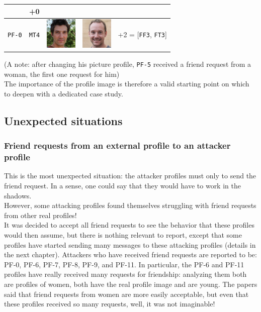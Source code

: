 \begin{center}
\begin{tabular}[c]{ |c|c|m{1.5cm}|m{1.5cm}|c| }
	& +0 \\	 
	\hline
	\cellcolor[HTML]{b0d7ff}\texttt{PF-0}
	&\cellcolor[HTML]{e6f2ff}\texttt{MT4}
	&\vspace{.15cm}	\includegraphics[height=1.5cm]{immagini/MT4.jpg}
	&\vspace{.15cm}	\includegraphics[height=1.5cm]{immagini/MT4-new.jpg}
	&+2 = [\texttt{FF3}, \texttt{FT3}]\\
	\hline 	 	 	 	 	
\end{tabular}
	
\end{center}
(A note: after changing his picture profile, \texttt{PF-5} received a friend request from a woman, the first one request for him)\\
The importance of the profile image is therefore a valid starting point on which to deepen with a dedicated case study.
\subsection{Unexpected situations}
\subsubsection*{Friend requests from an external profile to an attacker profile}
This is the most unexpected situation: the attacker profiles must only to send the friend request. In a sense, one could say that they would have to work in the shadows.\\However, some attacking profiles found themselves struggling with friend requests from other real profiles!\\It was decided to accept all friend requests to see the behavior that these profiles would then assume, but there is nothing relevant to report, except that some profiles have started sending many messages to these attacking profiles (details in the next chapter). Attackers who have received friend requests are reported to be: PF-0, PF-6, PF-7, PF-8, PF-9, and PF-11. In particular, the PF-6 and PF-11 profiles have really received many requests for friendship: analyzing them both are profiles of women, both have the real profile image and are young. The papers said that friend requests from women are more easily acceptable, but even that these profiles received so many requests, well, it was not imaginable!
